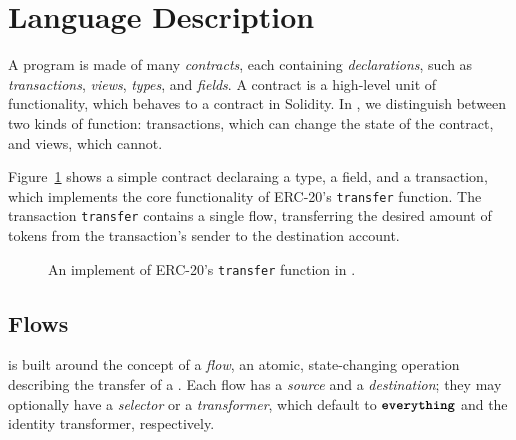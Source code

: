 \documentclass[dvipsnames, usenames, sigconf]{acmart}
\begin{document}


\section{Language Description}

A \langName program is made of many \emph{contracts}, each containing \emph{declarations}, such as \emph{transactions}, \emph{views}, \emph{types}, and \emph{fields}.
A contract is a high-level unit of functionality, which behaves  to a contract in Solidity.
In \langName, we distinguish between two kinds of function: transactions, which can change the state of the contract, and views, which cannot.

Figure~\ref{fig:erc20-transfer} shows a simple contract declaraing a type, a field, and a transaction, which implements the core functionality of ERC-20's \lstinline{transfer} function.
The transaction \lstinline{transfer} contains a single flow, transferring the desired amount of tokens from the transaction's sender to the destination account.

\begin{figure}[h]
    \centering
    
    \caption{An implement of ERC-20's \lstinline{transfer} function in \langName.}
    \label{fig:erc20-transfer}
\end{figure}

\subsection{Flows}
\langName is built around the concept of a \emph{flow}, an atomic, state-changing operation describing the transfer of a \assetTxt.
Each flow has a \emph{source} and a \emph{destination}; they may optionally have a \emph{selector} or a \emph{transformer}, which default to $\textbf{\texttt{everything}}$ and the identity transformer, respectively.
\end{document}

